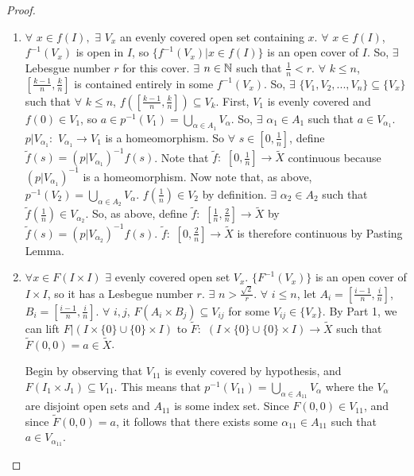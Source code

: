 \begin{proof}
	\begin{enumerate}
		\item $\forall$ $x \in f(I),$ $\exists$ $V_x$ an evenly covered open set containing $x$. $\forall$ $x \in f(I)$, $f^{-1}(V_x)$ is open in $I$, so $\{f^{-1}(V_x)|x \in f(I) \}$ is an open cover of $I$. So, $\exists$ Lebesgue number $r$ for this cover. $\exists$ $n \in \mathbb N$ such that $\tfrac{1}{n} < r$. $\forall$ $k \leq n$, $[ \frac{k-1}{n}, \frac{k}{n}]$ is contained entirely in some $f^{-1}(V_x)$. So, $\exists$ $\{ V_1, V_2, ... , V_n \} \subseteq \{ V_x \}$ such that $\forall$ $k \leq n$, $f([ \frac{k-1}{n}, \frac{k}{n}]) \subseteq V_k$. First, $V_1$ is evenly covered and $f(0) \in V_1$, so $a \in p^{-1}(V_1) = \bigcup_{ \alpha \in A_1}V_{\alpha}$. So, $\exists$ $\alpha_1 \in A_1$ such that $a \in V_{\alpha_1}$. $p | V_{\alpha_1}\colon$ $V_{\alpha_1} \to V_1$ is a homeomorphism. So $\forall$ $s \in [0, \tfrac{1}{n}]$, define $\widetilde{f}(s) = (p | V_{\alpha_1})^{-1} f(s)$. Note that $\widetilde{f} \colon$ $[0, \tfrac{1}{n}] \to \widetilde{X}$ continuous because $(p | V_{\alpha_1})^{-1}$ is a homeomorphism. Now note that, as above, $p^{-1}(V_2) = \bigcup_{ \alpha \in A_2}V_{\alpha}$. $f(\tfrac{1}{n}) \in V_2$ by definition. $\exists$ $\alpha_2 \in A_2$ such that $\widetilde{f}(\tfrac{1}{n}) \in V_{\alpha_2}$. So, as above, define $\widetilde{f} \colon$ $[\tfrac{1}{n}, \tfrac{2}{n}] \to \widetilde{X}$ by $\widetilde{f}(s) = (p | V_{\alpha_2})^{-1} f(s)$. $\widetilde{f} \colon$ $[0, \tfrac{2}{n}] \to \widetilde{X}$ is therefore continuous by Pasting Lemma.
		
		\item $\forall x \in F(I \times I)$ $\exists$ evenly covered open set $V_x$. $\{ F^{-1}(V_x) \}$ is an open cover of $I \times I$, so it has a Lesbegue number $r$. $\exists$ $n > \tfrac{\sqrt{2}}{r}$. $\forall$ $i \leq n$, let $A_i = [\tfrac{i-1}{n}, \tfrac{i}{n}]$, $B_i = [\tfrac{i-1}{n}, \tfrac{i}{n}]$. $\forall$ $i, j$, $F(A_i \times B_j) \subseteq V_{ij}$ for some $V_{ij} \in \{ V_x \}$. By Part 1, we can lift $F|(I \times \{ 0 \} \cup \{ 0 \} \times I)$ to $\widetilde{F} \colon$ $(I \times \{ 0 \} \cup \{ 0 \} \times I) \to \widetilde{X}$ such that $\widetilde{F}(0,0) = a \in \widetilde{X}$.
		
		Begin by observing that $V_{11}$ is evenly covered by hypothesis, and $F(I_1\times J_1)\subseteq V_{11}$. This means that $p^{-1}(V_{11})=\bigcup_{\alpha \in A_{11}}V_\alpha$ where the $V_\alpha$ are disjoint open sets and $A_{11}$ is some index set. Since $F(0,0)\in V_{11}$, and since $\widetilde{F}(0,0)=a$, it follows that there exists some $\alpha_{11}\in A_{11}$ such that $a\in V_{\alpha_ {11}}$.
		

\end{enumerate}
\end{proof}
